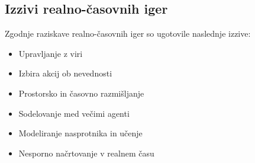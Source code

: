 \documentclass[a4paper, 12pt]{book}
\begin{document}
\subsection{Izzivi realno-časovnih iger}
Zgodnje raziskave realno-časovnih iger so ugotovile naslednje izzive:
\begin{itemize}
\item Upravljanje z viri
\item Izbira akcij ob nevednosti
\item Prostorsko in časovno razmišljanje
\item Sodelovanje med večimi agenti
\item Modeliranje nasprotnika in učenje
\item Nesporno načrtovanje v realnem času
\end{itemize}
\end{document}
